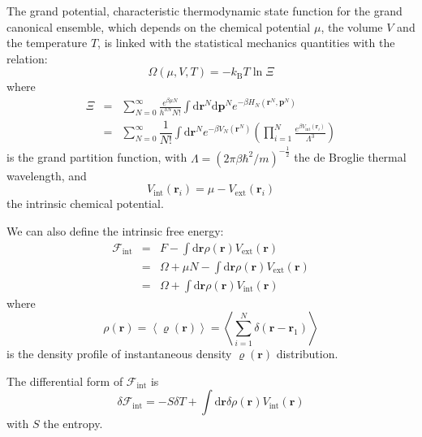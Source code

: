 The grand potential, characteristic thermodynamic state function for
the grand canonical ensemble, which depends on the chemical potential
$\mu$, the volume $V$ and the temperature $T$, is linked with the
statistical mechanics quantities with the relation:
\begin{equation}
\Omega(\mu,V,T)=-k_{\mathrm{B}}T\ln\Xi\label{eq:2}
\end{equation}
where
\begin{eqnarray}
\Xi & = & \sum_{N=0}^{\infty}\frac{e^{\beta\mu N}}{h^{3N}N!}\int\mathrm{d}\mathbf{r}^{N}\mathrm{d}\mathbf{p}^{N}e^{-\beta H_{N}(\mathbf{r}^{N},\mathbf{p}^{N})}\\
 & = & \sum_{N=0}^{\infty}\dfrac{\text{1}}{N!}\int\mathrm{d}\mathbf{r}^{N}e^{-\beta V_{N}(\mathbf{r}^{N})}\left(\prod_{i=1}^{N}\frac{e^{\beta V_{\mathrm{int}}(\mathbf{r}_{i})}}{\Lambda^{3}}\right)
\end{eqnarray}
 is the grand partition function, with $\Lambda=\left(2\pi\beta\hbar^{2}/m\right)^{-\frac{1}{2}}$
the de Broglie thermal wavelength, and
\begin{equation}
V_{\mathrm{int}}(\mathbf{r}_{i})=\mu-V_{\mathrm{ext}}(\mathbf{r}_{i})\label{eq:5}
\end{equation}
the intrinsic chemical potential. 

We can also define the intrinsic free energy: 
\begin{eqnarray}
\mathcal{F}_{\mathrm{int}} & = & F-\int\mathrm{d}\mathbf{r}\rho(\mathbf{r})V_{\mathrm{ext}}(\mathbf{r})\nonumber \\
 & = & \Omega+\mu N-\int\mathrm{d}\mathbf{r}\rho(\mathbf{r})V_{\mathrm{ext}}(\mathbf{r})\nonumber \\
 & = & \Omega+\int\mathrm{d}\mathbf{r}\rho(\mathbf{r})V_{\mathrm{int}}(\mathbf{r})\label{eq:f-int}
\end{eqnarray}
where 
\begin{equation}
\rho(\mathbf{r})=\left\langle \varrho(\mathbf{r})\right\rangle =\left\langle \sum_{i=1}^{N}\delta(\mathbf{r}-\mathbf{r}_{1})\right\rangle 
\end{equation}
is the density profile of instantaneous density $\varrho(\mathbf{r})$
distribution.

The differential form of $\mathcal{F}_{\mathrm{int}}$ is
\begin{equation}
\delta\mathcal{F}_{\mathrm{int}}=-S\delta T+\int\mathrm{d}\mathbf{r}\delta\rho(\mathbf{r})V_{\mathrm{int}}(\mathbf{r})\label{eq:delta-f-int}
\end{equation}
with $S$ the entropy.


